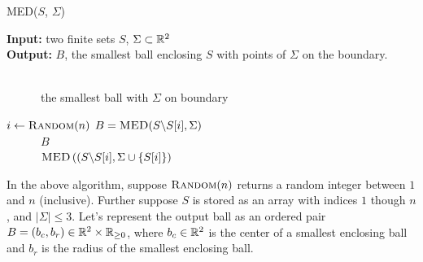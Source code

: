 \documentclass{article}
\begin{document}
\begin{algorithm}\caption{\textsc{MED($S$, $\Sigma$)}}\label{alg:seb}
    {\bf Input:} two finite sets $S$, $\Sigma \subset {\mathbb R}^2$\\
    {\bf Output:} $B$, the smallest ball enclosing $S$ with points of
    $\Sigma$ on the boundary.

    \begin{algorithmic}[1]
        \\
        ~~~~~~\Return the smallest ball with $\Sigma$ on boundary
        \EndIf

        \State $i \gets \textsc{Random}(n)$
        \State $B = \textsc{MED}(S \backslash S[i], \Sigma)$
        \\
        ~~~~~~\Return $B$
        \Else\\
        ~~~~~~\Return $\textsc{MED}\left((S \backslash S[i], \Sigma \cup \{ S[i]
        \}\right)$
        \EndIf
    \end{algorithmic}
\end{algorithm}

In the above algorithm, suppose $\textsc{Random}(n)$ returns a random integer
between $1$ and $n$ (inclusive).  Further suppose
$S$ is stored as an array with indices $1$ though $n$,
and $|\Sigma| \leq 3$.  Let's represent the output ball as an ordered
pair~$B=(b_c,b_r) \in {\mathbb R}^2 \times {\mathbb R}_{\geq 0}$,
where $b_c\in {\mathbb R}^2$ is the center of a smallest enclosing ball and $b_r$ is the
radius of the smallest enclosing ball.
\end{document}
